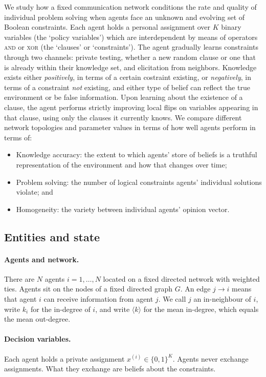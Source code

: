\documentclass[11pt]{article}
\begin{document}
We study how a fixed communication network conditions the rate and quality of individual problem solving when
agents face an unknown and evolving set of Boolean constraints. Each agent holds a personal assignment over
$K$ binary variables (the `policy variables') which are interdependent by means of operators \textsc{and} or \textsc{xor} (the `clauses' or `constraints').
The agent gradually learns constraints through two channels: private testing, whether a new random clause or one that is already within their knowledge set, and elicitation from neighbors. Knowledge exists either \textit{positively}, in terms of a certain costraint existing, or \textit{negatively}, in terms of a constraint \textit{not} existing, and either type of belief can reflect the true environment or be false information. Upon learning about the existence of a clause, the agent performs strictly improving local flips on variables appearing in that clause,
using only the clauses it currently knows. We compare
different network topologies and parameter values in terms of how well agents perform in terms of:
\begin{itemize}
  \item Knowledge accuracy: the extent to which agents' store of beliefs is a truthful representation of the environment and how that changes over time;
    \item Problem solving: the number of logical constraints agents' individual solutions violate; and
    \item Homogeneity: the variety between individual agents' opinion vector.
\end{itemize}


\subsection{Entities and state}

\paragraph{Agents and network.}
There are \(N\) agents \(i=1,\dots,N\) located on a fixed directed network with weighted ties. Agents sit on the nodes of a fixed directed graph $G$. An edge $j \to i$ means that agent $i$ can receive information from agent $j$. We call $j$ an in-neighbour of $i$, write $k_i$ for the in-degree of $i$, and write $\langle k\rangle$ for the mean in-degree, which equals the mean out-degree.

\paragraph{Decision variables.} Each agent holds a private assignment $x^{(i)} \in \{0,1\}^K$. Agents never exchange assignments. What they exchange are beliefs about the constraints.
\end{document}
